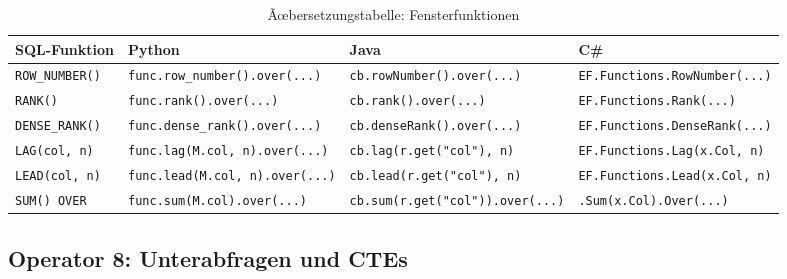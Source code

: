 \begin{table}
\centering
\caption{Ãœbersetzungstabelle: Fensterfunktionen}
\label{tab:window_ops}
\renewcommand{\arraystretch}{1.4}
\begin{tabularx}{\textwidth}{lXXX}
\toprule
\textbf{SQL-Funktion} & \textbf{Python} & \textbf{Java} & \textbf{C\#} \\
\midrule
\texttt{ROW\_NUMBER()}
  & \texttt{func.row\_number().over(...)}
  & \texttt{cb.rowNumber().over(...)}
  & \texttt{EF.Functions.RowNumber(...)} \\
\texttt{RANK()}
  & \texttt{func.rank().over(...)}
  & \texttt{cb.rank().over(...)}
  & \texttt{EF.Functions.Rank(...)} \\
\texttt{DENSE\_RANK()}
  & \texttt{func.dense\_rank().over(...)}
  & \texttt{cb.denseRank().over(...)}
  & \texttt{EF.Functions.DenseRank(...)} \\
\texttt{LAG(col, n)}
  & \texttt{func.lag(M.col, n).over(...)}
  & \texttt{cb.lag(r.get("col"), n)}
  & \texttt{EF.Functions.Lag(x.Col, n)} \\
\texttt{LEAD(col, n)}
  & \texttt{func.lead(M.col, n).over(...)}
  & \texttt{cb.lead(r.get("col"), n)}
  & \texttt{EF.Functions.Lead(x.Col, n)} \\
\texttt{SUM() OVER}
  & \texttt{func.sum(M.col).over(...)}
  & \texttt{cb.sum(r.get("col")).over(...)}
  & \texttt{.Sum(x.Col).Over(...)} \\
\bottomrule
\end{tabularx}
\end{table}

\subsection{Operator 8: Unterabfragen und CTEs}
\label{subsec:op_subquery}

